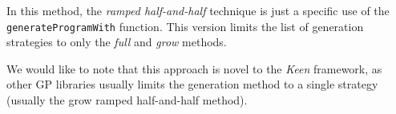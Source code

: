     In this method, the \textit{ramped half-and-half} technique is just a specific use of the 
    \texttt{generateProgramWith} function. This version limits the list of generation strategies to only the 
    \textit{full} and \textit{grow} methods.
    
    We would like to note that this approach is novel to the \textit{Keen} framework, as other GP libraries usually
    limits the generation method to a single strategy (usually the grow ramped half-and-half method).